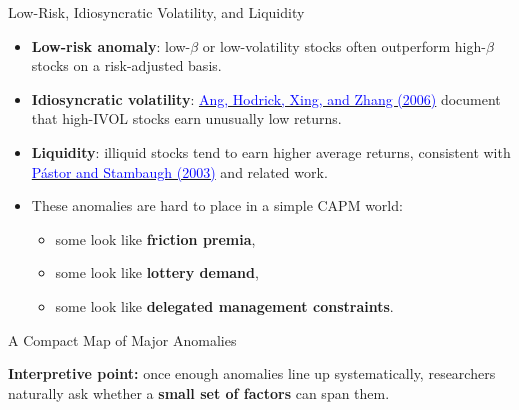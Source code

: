 \documentclass{beamer}
\begin{document}
\begin{frame}{Low-Risk, Idiosyncratic Volatility, and Liquidity}
	\begin{itemize}
		\item \textbf{Low-risk anomaly}: low-$\beta$ or low-volatility stocks often outperform high-$\beta$ stocks on a risk-adjusted basis.
		\item \textbf{Idiosyncratic volatility}: \href{https://doi.org/10.1111/j.1540-6261.2006.00836.x}{\textcolor{blue}{Ang, Hodrick, Xing, and Zhang (2006)}} document that high-IVOL stocks earn unusually low returns.
		\item \textbf{Liquidity}: illiquid stocks tend to earn higher average returns, consistent with \href{https://doi.org/10.1086/374184}{\textcolor{blue}{P\'astor and Stambaugh (2003)}} and related work.
		\item These anomalies are hard to place in a simple CAPM world:
		\begin{itemize}
			\item some look like \textbf{friction premia},
			\item some look like \textbf{lottery demand},
			\item some look like \textbf{delegated management constraints}.
		\end{itemize}
	\end{itemize}
\end{frame}

\begin{frame}{A Compact Map of Major Anomalies}
	\scriptsize
	\begin{table}
		\centering
	\end{table}

	\normalsize
	\textbf{Interpretive point:} once enough anomalies line up systematically, researchers naturally ask whether a \textbf{small set of factors} can span them.
\end{frame}
\end{document}
